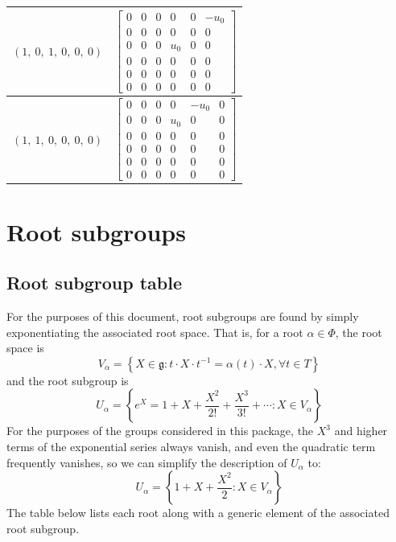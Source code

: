 \documentclass[11pt]{article}
\newcommand{\noi}{\noindent}
\newcommand{\inv}{^{-1}}
\newcommand{\lb}{\left\{}
\newcommand{\rb}{\right\}}
\newcommand{\frakg}{\mathfrak{g}}
\theoremstyle{definition}
\begin{document}
\begin{longtable}{|l|c|}
    \hline
    $\left( 1, \  0, \  1, \  0, \  0, \  0\right)$ & ${\left[\begin{matrix}0 & 0 & 0 & 0 & 0 & - u_{0}\\0 & 0 & 0 & 0 & 0 & 0\\0 & 0 & 0 & u_{0} & 0 & 0\\0 & 0 & 0 & 0 & 0 & 0\\0 & 0 & 0 & 0 & 0 & 0\\0 & 0 & 0 & 0 & 0 & 0\end{matrix}\right]}$ \\
    \hline
    $\left( 1, \  1, \  0, \  0, \  0, \  0\right)$ & ${\left[\begin{matrix}0 & 0 & 0 & 0 & - u_{0} & 0\\0 & 0 & 0 & u_{0} & 0 & 0\\0 & 0 & 0 & 0 & 0 & 0\\0 & 0 & 0 & 0 & 0 & 0\\0 & 0 & 0 & 0 & 0 & 0\\0 & 0 & 0 & 0 & 0 & 0\end{matrix}\right]}$ \\
    \hline
\end{longtable}


\newpage
\section{Root subgroups}

\subsection{Root subgroup table}

\noi For the purposes of this document, root subgroups are found by simply exponentiating the associated root space. That is, for a root $\alpha \in \Phi$, the root space is
\[
	V_\alpha = \lb X \in \frakg : t \cdot X \cdot t \inv = \alpha(t) \cdot X, \forall t \in T \rb
\]
and the root subgroup is
\[
	U_\alpha = \lb e^X = 1 + X + \frac{X^2}{2!} + \frac{X^3}{3!} + \cdots : X \in V_\alpha \rb
\]
For the purposes of the groups considered in this package, the $X^3$ and higher terms of the exponential series always vanish, and even the quadratic term frequently vanishes, so we can simplify the description of $U_\alpha$ to:
\[
	U_\alpha = \lb 1 + X + \frac{X^2}{2} : X \in V_\alpha \rb
\]
The table below lists each root along with a generic element of the associated root subgroup.
\end{document}
